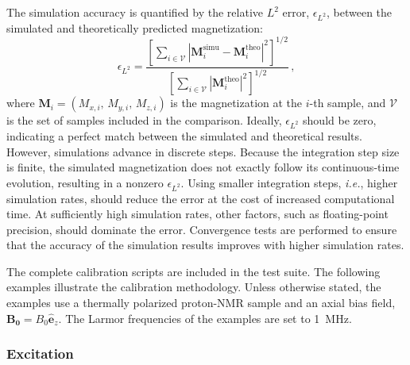 The simulation accuracy is quantified by the relative $L^2$ error, $\epsilon_{L^2}$, between the simulated and theoretically predicted magnetization:
\begin{equation}
    \epsilon_{L^2}
    =
    \frac{
        \left[
        \sum_{i\in\mathcal{V}}
        \left|\boldsymbol{M}_{i}^\mathrm{simu}-\boldsymbol{M}_{i}^\mathrm{theo}\right|^2
        \right]^{1/2}
    }{
        \left[
        \sum_{i\in\mathcal{V}}
        \left|\boldsymbol{M}_{i}^\mathrm{theo}\right|^2
        \right]^{1/2}
    }\,,
    \label{eq:relative_l2_error}
\end{equation}
where $\boldsymbol{M}_{i}=(M_{x,i},\,M_{y,i},\,M_{z,i})$ is the magnetization at the $i$-th sample, and $\mathcal{V}$ is the set of samples included in the comparison. 
Ideally, $\epsilon_{L^2}$ should be zero, indicating a perfect match between the simulated and theoretical results. 
However, simulations advance in discrete steps. 
Because the integration step size is finite, the simulated magnetization does not exactly follow its continuous-time evolution, resulting in a nonzero $\epsilon_{L^2}$. 
Using smaller integration steps, \textit{i.e.}, higher simulation rates, should reduce the error at the cost of increased computational time. 
At sufficiently high simulation rates, other factors, such as floating-point precision, should dominate the error. 
Convergence tests are performed to ensure that the accuracy of the simulation results improves with higher simulation rates.

The complete calibration scripts are included in the \axionbloch{} test suite. 
The following examples illustrate the calibration methodology.
Unless otherwise stated, the examples use a thermally polarized proton-NMR sample and an axial bias field, $\boldsymbol{B_{0}} = B_0 \boldsymbol{\hat{e}}_z$. 
The Larmor frequencies of the examples are set to \SI{1}{\MHz}. 

\subsubsection{Excitation}
\label{sec:calibration:excitation}

